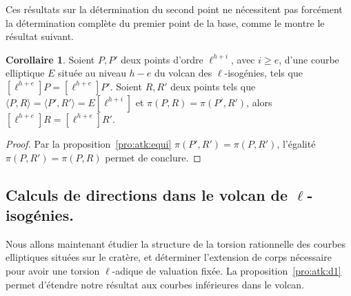\documentclass[10pt,a4paper]{book}
\theoremstyle{plain}
\theoremstyle{definition}
\theoremstyle{definition}
\theoremstyle{definition}
\newtheorem{cor}[thm]{Corollaire}
\theoremstyle{definition}
\newtheorem{prop}[thm]{Proposition}
\theoremstyle{definition}
\theoremstyle{remark}
\theoremstyle{remark}
\theoremstyle{definition}
\begin{document}
%

Ces résultats sur la détermination du second point ne nécessitent pas forcément
la détermination complète du premier point de la base, comme le montre le 
résultat suivant.

\begin{cor}
Soient $P,P'$ deux points d'ordre $\ell^{h+i}$, avec $i \geqslant e$, d'une 
courbe elliptique $E$ située au niveau $h-e$ du volcan des $\ell$-isogénies,
tels que $[\ell^{h+e}]P=[\ell^{h+e}]P'$. Soient $R,R'$ deux points tels que 
$\langle P, R \rangle = \langle P', R' \rangle=E[\ell^{h+i}]$ et $\pi(P,R)=
\pi(P',R')$, alors $[\ell^{h+e}]R=[\ell^{h+e}]R'$.
\end{cor}

\begin{proof}
Par la proposition~\ref{pro:atk:equi} $\pi(P',R')=\pi(P,R')$, l'égalité 
$\pi(P,R')=\pi(P,R)$ permet de conclure.
\end{proof}

\subsection{Calculs de directions dans le volcan de $\ell$-isogénies.}
\label{sub:atk:cal}
Nous allons maintenant étudier la structure de la torsion rationnelle des courbes 
elliptiques situées sur le cratère, et déterminer l'extension de corps 
nécessaire pour avoir une torsion $\ell$-adique de valuation fixée.
La proposition~\ref{pro:atk:d1} permet d'étendre notre résultat aux
courbes inférieures dans le volcan.
\end{document}

